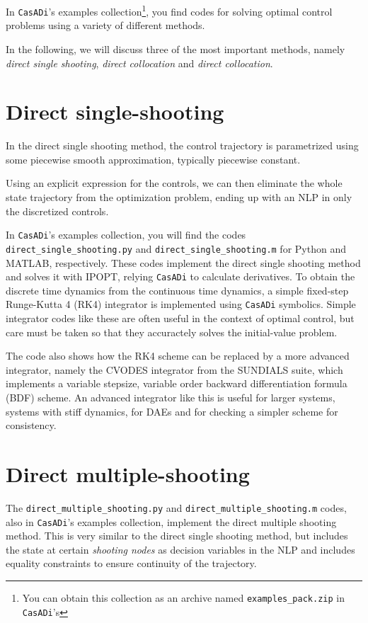 \documentclass[a4paper,12pt]{book}
\newcommand{\CasADi}{\texttt{CasADi}\xspace}
\begin{document}
In \CasADi's examples collection\footnote{You can obtain this collection as an archive named \texttt{examples\_pack.zip} in \CasADi's }, you find codes for solving optimal control problems using a variety of different methods.

In the following, we will discuss three of the most important methods, namely
\emph{direct single shooting}, \emph{direct collocation} and \emph{direct collocation}.

\section{Direct single-shooting}

In the direct single shooting method, the control trajectory is parametrized
using some piecewise smooth approximation, typically piecewise constant.

Using an explicit expression for the controls, we can then eliminate the whole
state trajectory from the optimization problem, ending up with an NLP in only
the discretized controls.

In \CasADi's examples collection, you will find the codes
\verb|direct_single_shooting.py| and \verb|direct_single_shooting.m|
for Python and MATLAB, respectively. These codes implement the direct single
shooting method and solves it with IPOPT, relying \CasADi to calculate derivatives.
To obtain the discrete time dynamics from the continuous time dynamics, a
simple fixed-step Runge-Kutta 4 (RK4) integrator is implemented using \CasADi symbolics.
Simple integrator codes like these are often useful in the context of optimal control,
but care must be taken so that they accuractely solves the initial-value
problem.

The code also shows how the RK4 scheme can be replaced by a
more advanced integrator, namely the CVODES integrator from the SUNDIALS suite,
which implements a variable stepsize, variable order backward differentiation formula
(BDF) scheme. An advanced integrator like this is useful for larger systems,
systems with stiff dynamics, for DAEs and for checking a simpler scheme for
consistency.

\section{Direct multiple-shooting}
The \verb|direct_multiple_shooting.py| and \verb|direct_multiple_shooting.m|
codes, also in \CasADi's examples collection, implement the direct multiple
shooting method. This is very similar to the direct single shooting method,
but includes the state at certain \emph{shooting nodes} as decision variables in
the NLP and includes equality constraints to ensure continuity of the trajectory.
\end{document}
